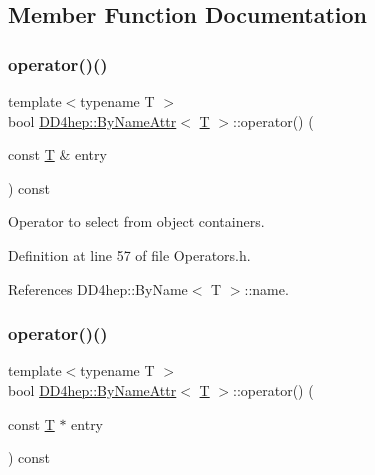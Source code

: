 \subsection{Member Function Documentation}
\hypertarget{class_d_d4hep_1_1_by_name_attr_ade50268ee6445ddf933edd4f1c43b899}{}\label{class_d_d4hep_1_1_by_name_attr_ade50268ee6445ddf933edd4f1c43b899} 
\subsubsection{\texorpdfstring{operator()()}{operator()()}\hspace{0.1cm}{\footnotesize\ttfamily [1/2]}}
{\footnotesize\ttfamily template$<$typename T $>$ \\
bool \hyperlink{class_d_d4hep_1_1_by_name_attr}{D\+D4hep\+::\+By\+Name\+Attr}$<$ \hyperlink{class_t}{T} $>$\+::operator() (\begin{DoxyParamCaption}\item[{const \hyperlink{class_t}{T} \&}]{entry }\end{DoxyParamCaption}) const\hspace{0.3cm}{\ttfamily [inline]}}



Operator to select from object containers. 



Definition at line 57 of file Operators.\+h.



References D\+D4hep\+::\+By\+Name$<$ T $>$\+::name.

\hypertarget{class_d_d4hep_1_1_by_name_attr_a00059495a4ebf7f700a88d8249577cb0}{}\label{class_d_d4hep_1_1_by_name_attr_a00059495a4ebf7f700a88d8249577cb0} 
\subsubsection{\texorpdfstring{operator()()}{operator()()}\hspace{0.1cm}{\footnotesize\ttfamily [2/2]}}
{\footnotesize\ttfamily template$<$typename T $>$ \\
bool \hyperlink{class_d_d4hep_1_1_by_name_attr}{D\+D4hep\+::\+By\+Name\+Attr}$<$ \hyperlink{class_t}{T} $>$\+::operator() (\begin{DoxyParamCaption}\item[{const \hyperlink{class_t}{T} $\ast$}]{entry }\end{DoxyParamCaption}) const\hspace{0.3cm}{\ttfamily [inline]}}




